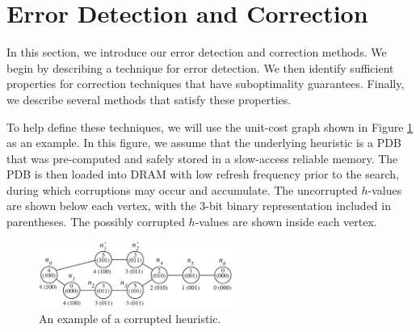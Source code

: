 \documentclass[letterpaper]{article}
\begin{document}


\section{Error Detection and Correction}

In this section, we introduce our error detection and correction methods. We begin by describing a technique for error detection. We then identify sufficient properties for correction techniques that have suboptimality guarantees. Finally, we describe several methods that satisfy these properties.

To help define these techniques, we will use the unit-cost graph shown in Figure \ref{fig:corruption_example} as an example.
In this figure, we assume that the underlying heuristic is a PDB that was pre-computed and safely stored in a slow-access reliable memory. The PDB is then loaded into DRAM with low refresh frequency prior to the search, during which corruptions may occur and accumulate.
The uncorrupted $h$-values are shown below each vertex, with the 3-bit binary representation included in parentheses. The possibly corrupted $h$-values are shown inside each vertex.



\begin{figure}[t]
\begin{center}
\includegraphics[width=240px]{figures/corruption_example5.pdf}
\caption{An example of a corrupted heuristic.}
\label{fig:corruption_example}
\end{center}
\end{figure}
\end{document}
